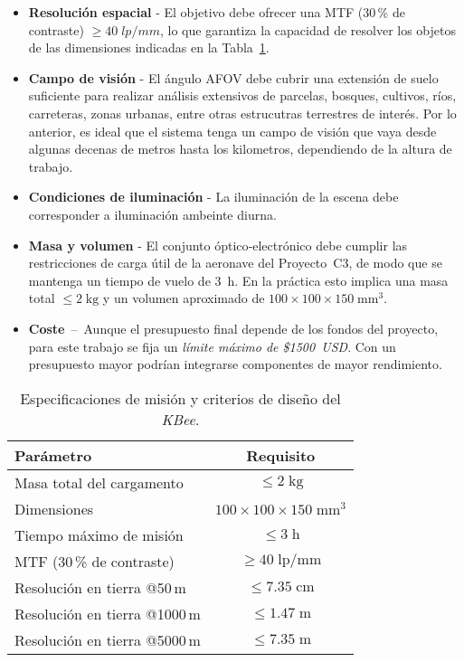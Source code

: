 \begin{itemize}
    \item \textbf{Resolución espacial} - El objetivo debe ofrecer una MTF (30\,\% de contraste) 
          \textbf{$\geq 40\;lp/mm$}, lo que garantiza la capacidad de resolver los objetos 
          de las dimensiones indicadas en la Tabla~\ref{tab:req_vs_obj}.
          
    \item \textbf{Campo de visión} - El ángulo AFOV debe cubrir una extensión de suelo suficiente para realizar análisis extensivos de parcelas, bosques, cultivos, ríos, carreteras, zonas urbanas, entre otras estrucutras terrestres de interés. Por lo anterior, es ideal que el sistema tenga un campo de visión que vaya desde algunas decenas de metros hasta los kilometros, dependiendo de la altura de trabajo.
    
    \item \textbf{Condiciones de iluminación} - La iluminación de la escena debe corresponder a iluminación ambeinte diurna.
    
    \item \textbf{Masa y volumen} - El conjunto óptico‑electrónico debe cumplir las 
          restricciones de carga útil de la aeronave del Proyecto C3, 
          de modo que se mantenga un tiempo de vuelo de 3 h.  
          En la práctica esto implica una masa total $\leq 2\;\text{kg}$ 
          y un volumen aproximado de $100\times100\times150\;\text{mm}^{3}$.
          
    \item \textbf{Coste} – Aunque el presupuesto final depende de los fondos del proyecto, 
          para este trabajo se fija un \emph{límite máximo de \$1500 USD}.  
          Con un presupuesto mayor podrían integrarse componentes de mayor rendimiento.
\end{itemize}


\begin{table}[h]
  \centering
  \caption{Especificaciones de misión y criterios de diseño del \textit{KBee}.}
  \label{tab:req_vs_obj}
  \begin{tabular}{|p{4cm}|c|}
      \hline
      \rowcolor[HTML]{EFEFEF}\textbf{Parámetro} & \textbf{Requisito} \\ \hline
      Masa total del cargamento & $\leq 2\;\text{kg}$ \\ \hline
      Dimensiones & $100 \times 100 \times 150\;\text{mm}^{3}$ \\ \hline
      Tiempo máximo de misión & $\leq 3\;\text{h}$ \\ \hline
      MTF (30\,\% de contraste) & $\geq 40\;\text{lp/mm}$ \\ \hline
      Resolución en tierra @50\,m & $\leq 7.35\;\text{cm}$ \\ \hline
      Resolución en tierra @1000\,m & $\leq 1.47\;\text{m}$ \\ \hline
      Resolución en tierra @5000\,m & $\leq 7.35\;\text{m}$ \\ \hline
  \end{tabular}
\end{table}

